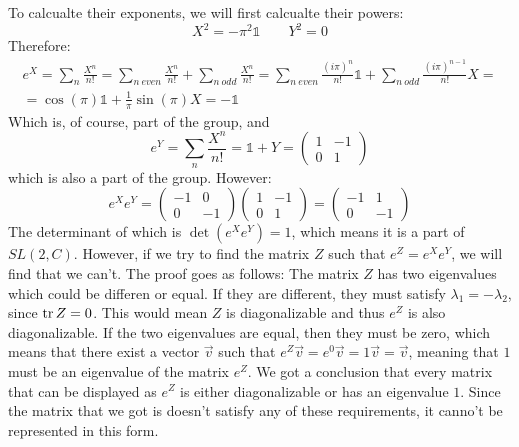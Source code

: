 \documentclass{article}
\begin{document}
To calcualte their exponents, we will first calcualte their powers:
\begin{equation}
    X^2 = -\pi^2 \mathbb{1} \qquad Y^2 = 0
\end{equation}
Therefore:
\begin{equation}
\begin{gathered}
    e^X = \sum_n \frac{X^n}{n!} = \sum_{n \ even} \frac{X^n}{n!} + \sum_{n \ odd} \frac{X^n}{n!} = \sum_{n \ even} \frac{(i\pi)^n}{n!}\mathbb{1} + \sum_{n \ odd} \frac{(i\pi)^{n-1}}{n!}X = \\ =
    \cos(\pi)\mathbb{1} + \frac{1}{\pi}\sin(\pi)X = -\mathbb{1}
\end{gathered}
\end{equation}
Which is, of course, part of the group, and
\begin{equation}
    e^{Y} = \sum_n \frac{X^n}{n!} = \mathbb{1} + Y = \begin{pmatrix}
        1 & -1 \\ 0 & 1
    \end{pmatrix}
\end{equation}
which is also a part of the group. However:
\begin{equation}
    e^Xe^Y = \begin{pmatrix}
        -1 & 0 \\ 0 & -1
    \end{pmatrix}\begin{pmatrix}
        1 & -1 \\ 0 & 1
    \end{pmatrix} = \begin{pmatrix}
        -1 & 1 \\ 0 & -1
    \end{pmatrix}
\end{equation}
The determinant of which is $\det(e^Xe^Y) = 1$, which means it is a part of $SL(2,C)$. However, if we try to find the matrix $Z$ such that $e^Z = e^Xe^Y$, we will find that we can't. The proof goes as follows:
\newline
The matrix $Z$ has two eigenvalues which could be differen or equal. If they are different, they must satisfy $\lambda_1 = -\lambda_2$, since $\tr Z = 0$. This would mean $Z$ is diagonalizable and thus $e^Z$ is also diagonalizable. If the two eigenvalues are equal, then they must be zero, which means that there exist a vector $\vec{v}$ such that $e^Z\vec{v} = e^0\vec{v} = 1\vec{v} = \vec{v}$, meaning that $1$ must be an eigenvalue of the matrix $e^Z$. We got a conclusion that every matrix that can be displayed as $e^Z$ is either diagonalizable or has an eigenvalue $1$. Since the matrix that we got is doesn't satisfy any of these requirements, it canno't be represented in this form. 
\end{document}
